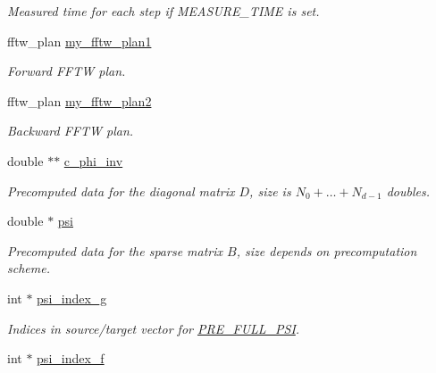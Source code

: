\begin{CompactItemize}
\begin{CompactList}\small\item\em Measured time for each step if MEASURE\_\-TIME is set. \item\end{CompactList}\item 
\hypertarget{structnfft__plan_o16}{
fftw\_\-plan \hyperlink{structnfft__plan_o16}{my\_\-fftw\_\-plan1}}
\label{structnfft__plan_o16}

\begin{CompactList}\small\item\em Forward FFTW plan. \item\end{CompactList}\item 
\hypertarget{structnfft__plan_o17}{
fftw\_\-plan \hyperlink{structnfft__plan_o17}{my\_\-fftw\_\-plan2}}
\label{structnfft__plan_o17}

\begin{CompactList}\small\item\em Backward FFTW plan. \item\end{CompactList}\item 
\hypertarget{structnfft__plan_o18}{
double $\ast$$\ast$ \hyperlink{structnfft__plan_o18}{c\_\-phi\_\-inv}}
\label{structnfft__plan_o18}

\begin{CompactList}\small\item\em Precomputed data for the diagonal matrix $D$, size is $N_0+\hdots+N_{d-1}$ doubles. \item\end{CompactList}\item 
\hypertarget{structnfft__plan_o19}{
double $\ast$ \hyperlink{structnfft__plan_o19}{psi}}
\label{structnfft__plan_o19}

\begin{CompactList}\small\item\em Precomputed data for the sparse matrix $B$, size depends on precomputation scheme. \item\end{CompactList}\item 
\hypertarget{structnfft__plan_o20}{
int $\ast$ \hyperlink{structnfft__plan_o20}{psi\_\-index\_\-g}}
\label{structnfft__plan_o20}

\begin{CompactList}\small\item\em Indices in source/target vector for \hyperlink{group__nfft_ga21}{PRE\_\-FULL\_\-PSI}. \item\end{CompactList}\item 
\hypertarget{structnfft__plan_o21}{
int $\ast$ \hyperlink{structnfft__plan_o21}{psi\_\-index\_\-f}}
\label{structnfft__plan_o21}


\end{CompactItemize}

